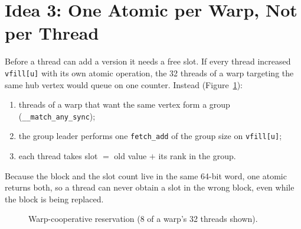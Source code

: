 \documentclass[11pt,a4paper,oneside]{report}
\newcommand{\code}[1]{\texttt{#1}}
\begin{document}
\section{Idea 3: One Atomic per Warp, Not per Thread}
Before a thread can add a version it needs a free slot. If every thread increased \code{vfill[u]} with its own atomic
operation, the 32 threads of a warp targeting the same hub vertex would queue on one counter. Instead
(Figure~\ref{fig:resv}):
\begin{enumerate}
\item threads of a warp that want the same vertex form a group (\code{\_\_match\_any\_sync});
\item the group leader performs one \code{fetch\_add} of the group size on \code{vfill[u]};
\item each thread takes slot $=$ old value $+$ its rank in the group.
\end{enumerate}
Because the block and the slot count live in the same 64-bit word, one atomic returns both, so a thread can never
obtain a slot in the wrong block, even while the block is being replaced.

\begin{figure}[H]
\centering
{}
\caption{Warp-cooperative reservation (8 of a warp's 32 threads shown).}
\label{fig:resv}
\end{figure}
\end{document}
